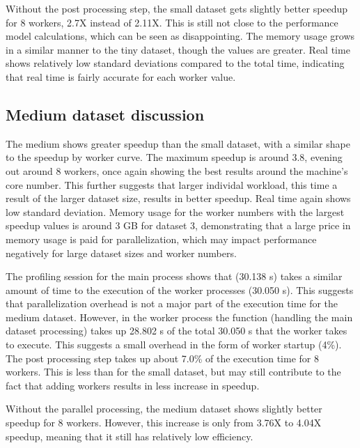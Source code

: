 Without the post processing step, the small dataset gets slightly better speedup for 8 workers, 2.7X instead of 2.11X. This is still not close to
the performance model calculations, which can be seen as disappointing. The memory usage grows in a similar manner to the tiny dataset, though the values are greater.
Real time shows relatively low standard deviations compared to the total time, indicating that real time is fairly accurate for each worker
value.

\subsection{Medium dataset discussion}
The medium shows greater speedup than the small dataset, with a similar shape to the speedup by worker curve. The maximum speedup is
around 3.8, evening out around 8 workers, once again showing the best results around the machine's core number. This further suggests that larger
individal workload, this time a result of the larger dataset size, results in better speedup. Real time again shows
low standard deviation. Memory usage for the worker numbers with the largest speedup values is around 3 GB for dataset 3, demonstrating
that a large price in memory usage is paid for parallelization, which may impact performance negatively for large dataset sizes and
worker numbers.

The profiling session for the main process shows that  (30.138 s) takes a similar amount of time to the execution of
the worker processes (30.050 s). This suggests that parallelization overhead is not a major part of the execution time for the medium dataset.
However, in the worker process the  function (handling the main dataset processing) takes up 28.802 s of the total 30.050 s that the
worker takes to execute. This suggests a small overhead in the form of worker startup (4\%).
The post processing step takes up about 7.0\% of the execution time for 8 workers. This is less than for the small dataset, but may still contribute
to the fact that adding workers results in less increase in speedup.

Without the parallel processing, the medium dataset shows slightly better speedup for 8 workers. However, this increase is only from 3.76X to 4.04X
speedup, meaning that it still has relatively low efficiency.

